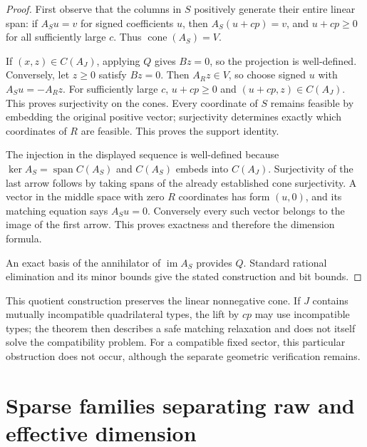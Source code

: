\begin{proof}
First observe that the columns in $S$ positively generate their entire
linear span: if $A_Su=v$ for signed coefficients $u$, then
$A_S(u+cp)=v$, and $u+cp\geq0$ for all sufficiently large $c$.
Thus $\operatorname{cone}(A_S)=V$.

If $(x,z)\in C(A_J)$, applying $Q$ gives $Bz=0$, so the projection is
well-defined.  Conversely, let $z\geq0$ satisfy $Bz=0$.  Then
$A_Rz\in V$, so choose signed $u$ with $A_Su=-A_Rz$.  For sufficiently
large $c$, $u+cp\geq0$ and $(u+cp,z)\in C(A_J)$.  This proves
surjectivity on the cones.  Every coordinate of $S$ remains feasible
by embedding the original positive vector; surjectivity determines
exactly which coordinates of $R$ are feasible.  This proves the
support identity.

The injection in the displayed sequence is well-defined because
$\ker A_S=\operatorname{span}C(A_S)$ and $C(A_S)$ embeds into
$C(A_J)$.  Surjectivity of the last arrow follows by taking spans of
the already established cone surjectivity.  A vector in the middle
space with zero $R$ coordinates has form $(u,0)$, and its matching
equation says $A_Su=0$.  Conversely every such vector belongs to the
image of the first arrow.  This proves exactness and therefore the
dimension formula.

An exact basis of the annihilator of $\operatorname{im}A_S$ provides
$Q$.  Standard rational elimination and its minor bounds give the
stated construction and bit bounds.
\end{proof}

This quotient construction preserves the linear nonnegative cone.
If $J$ contains mutually incompatible quadrilateral types, the lift by
$cp$ may use incompatible types; the theorem then describes a safe
matching relaxation and does not itself solve the compatibility
problem.  For a compatible fixed sector, this particular obstruction
does not occur, although the separate geometric verification remains.

\section{Sparse families separating raw and effective dimension}

